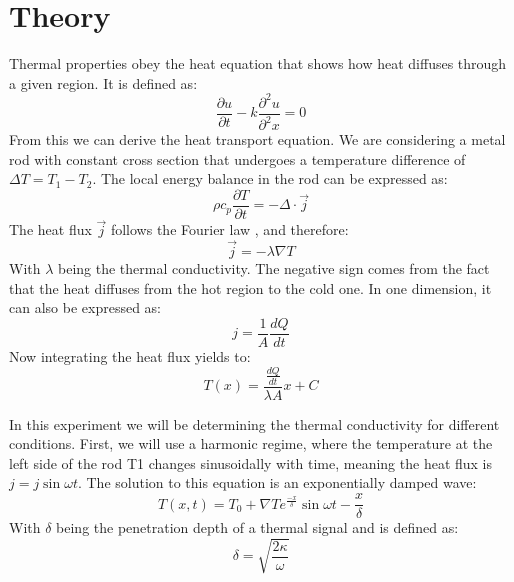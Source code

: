 \documentclass{scrartcl}
\begin{document}
\section{Theory}

Thermal properties obey the heat equation that shows how heat diffuses through a given region. It is defined as:
\begin{equation}
    \frac{\partial u}{\partial t}-k\frac{\partial^2u}{\partial^2x}=0
\end{equation}
From this we can derive the heat transport equation. We  are considering a metal rod with constant cross section that undergoes a temperature difference of $\Delta T = T_1-T_2$. The local energy balance in the rod can be expressed as:
\[ \rho c_p \frac{\partial T}{\partial t} = -\Delta \cdot \Vec{j}\]
The heat flux $\Vec{j}$ follows the Fourier law , and therefore:
\[ \Vec{j} = -\lambda \nabla T\]
With $\lambda$ being the thermal conductivity. The negative sign comes from the fact that the heat diffuses from the hot region to the cold one.
In one dimension, it can also be expressed as:
\[ j = \frac{1}{A}\frac{dQ}{dt} \]
Now integrating the heat flux yields to:
\begin{equation}
    T(x) = \frac{\frac{dQ}{dt}}{\lambda A}x+C
\end{equation}

In this experiment we will be determining the thermal conductivity for different conditions. First, we will use a harmonic regime, where the temperature at the left side of the rod T1 changes sinusoidally with time, meaning the heat flux is $j = j\sin{\omega t}$. The solution to this equation is an exponentially damped wave:
\begin{equation}
    T(x,t) = T_0 + \nabla Te^{\frac{-x}{\delta}}\sin{\omega t - \frac{x}{\delta}}
\end{equation}
With $\delta$ being the penetration depth of a thermal signal and is defined as:
\begin{equation}
    \delta = \sqrt{\frac{2\kappa}{\omega}}
\end{equation}
\end{document}
